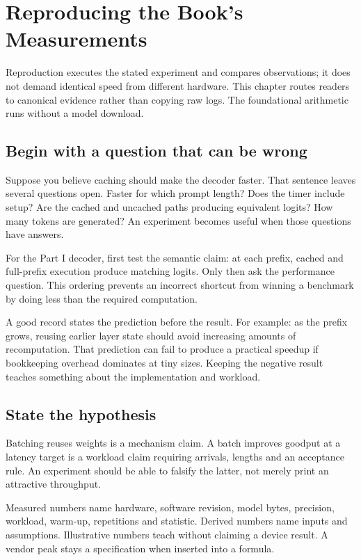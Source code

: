\chapter{Reproducing the Book's Measurements}\label{app:reproducing}
\begin{ChapterIntent}
Reproduction executes the stated experiment and compares observations;
it does not demand identical speed from different hardware. This chapter
routes readers to canonical evidence rather than copying raw logs.
The foundational arithmetic runs without a model download.
\end{ChapterIntent}

\section{Begin with a question that can be wrong}
Suppose you believe caching should make the decoder faster. That
sentence leaves several questions open. Faster for which prompt
length? Does the timer include setup? Are the cached and uncached
paths producing equivalent logits? How many tokens are generated?
An experiment becomes useful when those questions have answers.

For the Part I decoder, first test the semantic claim: at each
prefix, cached and full-prefix execution produce matching logits.
Only then ask the performance question. This ordering prevents an
incorrect shortcut from winning a benchmark by doing less than the
required computation.

A good record states the prediction before the result. For example:
as the prefix grows, reusing earlier layer state should avoid
increasing amounts of recomputation. That prediction can fail to
produce a practical speedup if bookkeeping overhead dominates at
tiny sizes. Keeping the negative result teaches something about
the implementation and workload.

\section{State the hypothesis}
Batching reuses weights is a mechanism claim. A batch improves goodput
at a latency target is a workload claim requiring arrivals, lengths and
an acceptance rule. An experiment should be able to falsify the latter,
not merely print an attractive throughput.

Measured numbers name hardware, software revision, model bytes, precision,
workload, warm-up, repetitions and statistic. Derived numbers name inputs
and assumptions. Illustrative numbers teach without claiming a device
result. A vendor peak stays a specification when inserted into a formula.

